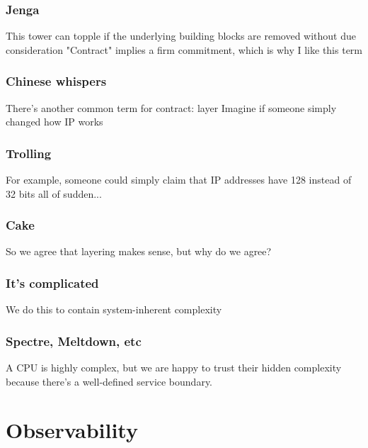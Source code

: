 \documentclass[t]{beamer}
\begin{document}
\begin{frame}
	\frametitle{Jenga}
	\begin{center}
		\vfill
		This tower can topple if the underlying building blocks are removed without due consideration
		\vfill
		"Contract" implies a firm commitment, which is why I like this term
		\vfill
	\end{center}
\end{frame}

\begin{frame}
	\frametitle{Chinese whispers}
	\begin{center}
		\vfill
		There's another common term for contract: layer
		\vfill
		Imagine if someone simply changed how IP works
		\vfill
	\end{center}
\end{frame}

\begin{frame}
	\frametitle{Trolling}
	\begin{center}
		\vfill
		For example, someone could simply claim that IP addresses have 128 instead of 32 bits all of sudden...
		\vfill
	\end{center}
\end{frame}

\begin{frame}
	\frametitle{Cake}
	\begin{center}
		\vfill
		So we agree that layering makes sense, but why do we agree?
		\vfill
	\end{center}
\end{frame}

\begin{frame}
	\frametitle{It's complicated}
	\begin{center}
		\vfill
		We do this to contain system-inherent complexity
		\vfill
	\end{center}
\end{frame}

\begin{frame}
	\frametitle{Spectre, Meltdown, etc}
	\begin{center}
		\vfill
		A CPU is highly complex, but we are happy to trust their hidden complexity because there's a well-defined service boundary.
		\vfill
	\end{center}
\end{frame}



\section{Observability}
\end{document}
